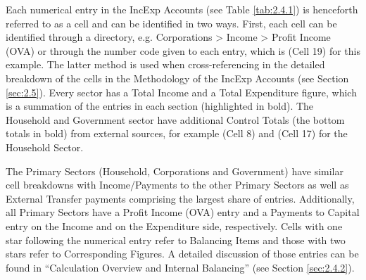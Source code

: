 Each numerical entry in the IncExp Accounts (see Table \ref{tab:2.4.1}) is henceforth referred to as a cell and can be identified in two ways. First, each cell can be identified through a directory, e.g. Corporations > Income > Profit Income (OVA) or through the number code given to each entry, which is (Cell 19) for this example. The latter method is used when cross-referencing in the detailed breakdown of the cells in the Methodology of the IncExp Accounts (see Section \ref{sec:2.5}). Every sector has a Total Income and a Total Expenditure figure, which is a summation of the entries in each section (highlighted in bold). The Household and Government sector have additional Control Totals (the bottom totals in bold) from external sources, for example (Cell 8) and (Cell 17) for the Household Sector.

\bigskip

The Primary Sectors (Household, Corporations and Government) have similar cell breakdowns with Income/Payments to the other Primary Sectors as well as External Transfer payments comprising the largest share of entries. Additionally, all Primary Sectors have a Profit Income (OVA) entry and a Payments to Capital entry on the Income and on the Expenditure side, respectively. Cells with one star following the numerical entry refer to Balancing Items and those with two stars refer to Corresponding Figures. A detailed discussion of those entries can be found in ``Calculation Overview and Internal Balancing'' (see Section \ref{sec:2.4.2}).




